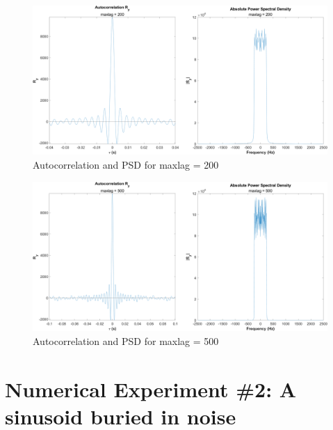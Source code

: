\documentclass[12pt]{article}
\begin{document}
\begin{figure}[h]
	\centering
	\includegraphics[width=\textwidth]{exp1_maxlag_200}
	\caption{\label{fig:exp1_maxlag200}Autocorrelation and PSD for maxlag = 200}
\end{figure}

\begin{figure}[h]
	\centering
	\includegraphics[width=\textwidth]{exp1_maxlag_500}
	\caption{\label{fig:exp1_maxlag500}Autocorrelation and PSD for maxlag = 500}
\end{figure}


\section*{Numerical Experiment \#2: A sinusoid buried in noise}

\end{document}
